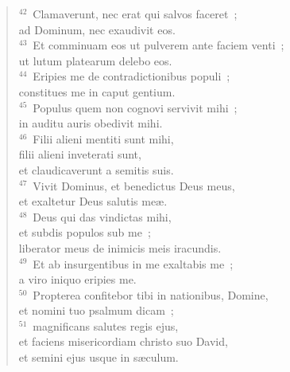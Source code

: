 \begin{flushleft}
\begin{verse}
${}^{42}$~Clamaverunt, nec erat qui salvos faceret~;\\ ad Dominum, nec exaudivit eos.\\
${}^{43}$~Et comminuam eos ut pulverem ante faciem venti~;\\ ut lutum platearum delebo eos.\\
${}^{44}$~Eripies me de contradictionibus populi~;\\ constitues me in caput gentium.\\
${}^{45}$~Populus quem non cognovi servivit mihi~;\\ in auditu auris obedivit mihi.\\
${}^{46}$~Filii alieni mentiti sunt mihi,\\ filii alieni inveterati sunt,\\ et claudicaverunt a semitis suis.\\
${}^{47}$~Vivit Dominus, et benedictus Deus meus,\\ et exaltetur Deus salutis me\ae .\\
${}^{48}$~Deus qui das vindictas mihi,\\ et subdis populos sub me~;\\ liberator meus de inimicis meis iracundis.\\
${}^{49}$~Et ab insurgentibus in me exaltabis me~;\\ a viro iniquo eripies me.\\
${}^{50}$~Propterea confitebor tibi in nationibus, Domine,\\ et nomini tuo psalmum dicam~;\\
${}^{51}$~magnificans salutes regis ejus,\\ et faciens misericordiam christo suo David,\\ et semini ejus usque in s\ae culum.\end{verse}\end{flushleft}




